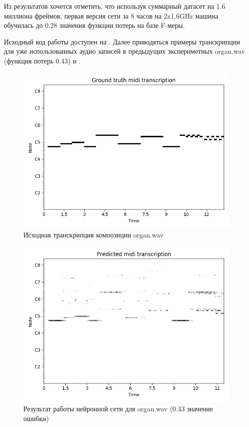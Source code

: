 Из результатов хочется отметить, что используя суммарный датасет на 1.6
миллиона фреймов, первая версия сети за 8 часов на 2x1.6GHz машина обучилась
до 0.28 значения функции потерь на базе F-меры.

Исходный код работы доступен на \cite{L:music-recognizer}. Далее приводяться
примеры транскрипции для уже использованных аудио записей в предыдущих
экспериметных organ.wav (функция потерь 0.43) и \cite{L:daj-ci-boza}.

\begin{figure}
  \centering
    \includegraphics[scale=.8]{res/organ-note-groundtruth.png}
  \centering
  \caption{Исходная транскрипция композиции organ.wav}
    \label{F:organ-notes}
\end{figure}

\begin{figure}
  \centering
    \includegraphics[scale=.8]{res/organ-overfit-028-acoustic.png}
  \centering
  \caption{Результат работы нейронной сети для organ.wav (0.43 значение ошибки)}
    \label{F:organ-pred}
\end{figure}

